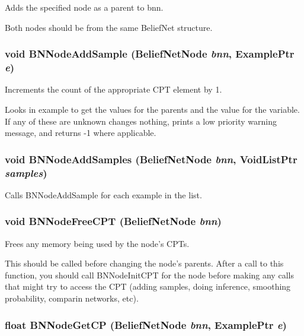 Adds the specified node as a parent to bnn. 

Both nodes should be from the same Belief\-Net structure. 
\subsubsection{\setlength{\rightskip}{0pt plus 5cm}void BNNode\-Add\-Sample ({\bf Belief\-Net\-Node} {\em bnn}, {\bf Example\-Ptr} {\em e})}\label{BeliefNet_8h_a30}


Increments the count of the appropriate CPT element by 1. 

Looks in example to get the values for the parents and the value for the variable. If any of these are unknown changes nothing, prints a low priority warning message, and returns -1 where applicable. 
\subsubsection{\setlength{\rightskip}{0pt plus 5cm}void BNNode\-Add\-Samples ({\bf Belief\-Net\-Node} {\em bnn}, {\bf Void\-List\-Ptr} {\em samples})}\label{BeliefNet_8h_a31}


Calls BNNode\-Add\-Sample for each example in the list. 

\subsubsection{\setlength{\rightskip}{0pt plus 5cm}void BNNode\-Free\-CPT ({\bf Belief\-Net\-Node} {\em bnn})}\label{BeliefNet_8h_a27}


Frees any memory being used by the node's CPTs. 

This should be called before changing the node's parents. After a call to this function, you should call BNNode\-Init\-CPT for the node before making any calls that might try to access the CPT (adding samples, doing inference, smoothing probability, comparin networks, etc). 
\subsubsection{\setlength{\rightskip}{0pt plus 5cm}float BNNode\-Get\-CP ({\bf Belief\-Net\-Node} {\em bnn}, {\bf Example\-Ptr} {\em e})}\label{BeliefNet_8h_a38}


